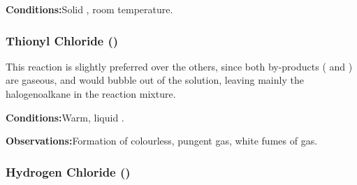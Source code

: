 				\vspace{1.5em}
				\vbox{\textbf{Conditions:}\tabto{35mm}Solid , room temperature.}


			\subsubsection{Thionyl Chloride ()}

				This reaction is slightly preferred over the others, since both by-products ( and ) are
				gaseous, and would bubble out of the solution, leaving mainly the halogenoalkane in the reaction mixture.

				\vspace{1.5em}
				\vbox{\textbf{Conditions:}\tabto{35mm}Warm, liquid .}

				\vspace{0.75em}
				\vbox{\textbf{Observations:}\tabto{35mm}Formation of colourless, pungent  gas,
											\tabto{35mm}white fumes of  gas.}


			\pagebreak
			\subsubsection{Hydrogen Chloride ()}

